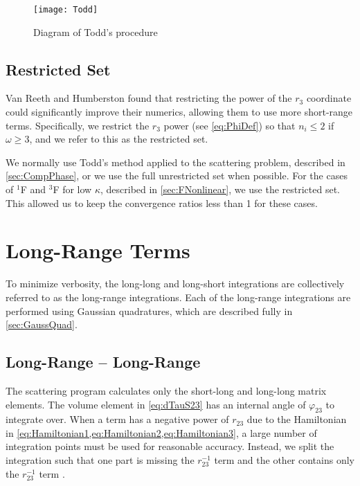\documentclass[Dissertation.tex]{subfiles}
\begin{document}
\begin{figure}
	\centering
	{\texttt{[image: Todd]}}
	\caption{Diagram of Todd's procedure}
	\label{fig:Todd}
\end{figure}



\subsection{Restricted Set}
\label{sec:Restricted}
Van Reeth and Humberston \cite{VanReeth2003} found that restricting the power 
of the $r_3$ coordinate could significantly improve their numerics, allowing 
them to use more short-range terms. Specifically, we restrict the $r_3$ power 
(see \cref{eq:PhiDef}) so that $n_i \leq 2$ if $\omega \geq 3$, and we refer 
to this as the restricted set.

We normally use Todd's method applied to the scattering problem,
described in \cref{sec:CompPhase}, or we 
use the full unrestricted set when possible. For the cases of $^1$F and $^3$F 
for low $\kappa$, described in \cref{sec:FNonlinear}, we use the restricted 
set. This allowed us to keep the convergence ratios less than 1 for these
cases.


\section{Long-Range Terms}
\label{sec:CompLong}

To minimize verbosity, the long-long and long-short integrations are 
collectively referred to as the long-range integrations. Each of the
long-range integrations are performed using Gaussian quadratures, which
are described fully in \cref{sec:GaussQuad}. 


\subsection{Long-Range -- Long-Range}
\label{sec:LongLongInt}

The scattering program calculates only the short-long and long-long matrix 
elements. The volume element in \cref{eq:dTauS23} has an internal angle 
of $\varphi_{23}$ to integrate over. When a term has a negative power of
$r_{23}$ due to the Hamiltonian in
\cref{eq:Hamiltonian1,eq:Hamiltonian2,eq:Hamiltonian3}, a large
number of integration points must be used for reasonable 
accuracy. Instead, we split the integration such that one part is missing 
the $r_{23}^{-1}$ term and the other contains only the $r_{23}^{-1}$ term
\cite{VanReethThesis,VanReethPrivate}.
\end{document}
